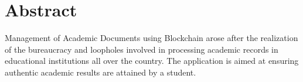 \chapter*{Abstract}

Management of Academic Documents using Blockchain arose after the realization of the bureaucracy and loopholes involved in processing academic records in educational institutions all over the country. The application is aimed at ensuring authentic academic results are attained by a student.

